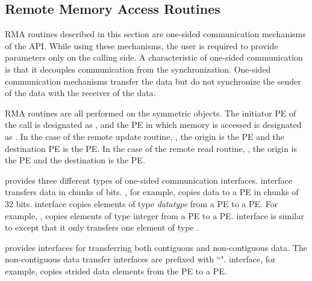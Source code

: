 \subsection{Remote Memory Access Routines}
\label{sec:rma}
\ac{RMA} routines described in this section are one-sided communication
mechanisms of the \openshmem{} \ac{API}. While using these mechanisms, the user is required to provide parameters only on the calling side. A characteristic of one-sided communication is that it decouples communication from
the synchronization. One-sided communication mechanisms transfer 
the data but do not synchronize the sender of the data with the receiver of the data. 

\openshmem{} \ac{RMA} routines are all performed on the symmetric objects. 
The initiator \ac{PE} of the call is designated as \source{}, and the 
\ac{PE} in which memory is accessed is designated as \dest{}. In the case of the remote
update routine, \PUT{}, the origin is the \source{} \ac{PE} and the 
destination \ac{PE} is the \dest{} PE. In the case of the remote read routine, \GET{}, 
the origin is the \dest{} \ac{PE} and the destination is the \source{} \ac{PE}.

\openshmem{} provides three different types of one-sided communication interfaces. 
 interface transfers data in chunks 
of bits. , for example, copies data to a \dest{} \ac{PE} in chunks of 32 bits.  interface copies elements of type 
\textit{datatype} from a \source{} \ac{PE} to a \dest{} \ac{PE}. 
For example, , copies elements
of type integer from a \source{} \ac{PE} to a \dest{} \ac{PE}. 
 interface is similar to  except that it only transfers one element of type .

\openshmem{} provides interfaces for transferring both contiguous and 
non-contiguous data. The non-contiguous data transfer interfaces are prefixed 
with ``".  interface, for example, copies strided data elements from the \source{} \ac{PE} to a \dest{} \ac{PE}. 


